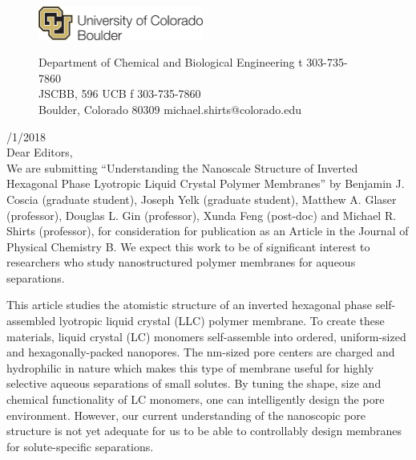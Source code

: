 \documentclass[fontsize=11pt]{article}
\begin{document}
	\graphicspath{{./figures/}}

	\begin{figure}
	\centering
	\begin{minipage}{0.37\textwidth}
	\includegraphics[width=2.14in,left]{CUBoulder.pdf}
	\end{minipage}
	\begin{minipage}{0.62\textwidth}
	\scriptsize
	\noindent Department of Chemical and Biological Engineering \hfill t 303-735-7860~~~~~~~~~~~~~~~~~~ \\
	\noindent JSCBB, 596 UCB \hfill f 303-735-7860~~~~~~~~~~~~~~~~~~ \\
	\noindent Boulder, Colorado 80309 \hfill michael.shirts@colorado.edu \\
	\end{minipage}
	\end{figure}
	
	/1/2018\\
	
	\noindent Dear Editors,\\
	
	We are submitting ``Understanding the Nanoscale Structure of Inverted Hexagonal 
	Phase Lyotropic Liquid Crystal Polymer Membranes'' by Benjamin J. Coscia (graduate
	student), Joseph Yelk (graduate student), Matthew A. Glaser (professor), Douglas
	L. Gin (professor), Xunda Feng (post-doc) and Michael R. Shirts (professor), for
	consideration for publication as an Article in the Journal of Physical Chemistry
	B. We expect this work to be of significant interest to researchers who study 
	nanostructured polymer membranes for aqueous separations.
	
	This article studies the atomistic structure of an inverted hexagonal phase 
	self-assembled lyotropic liquid crystal (LLC) polymer membrane. To create these
	materials, liquid crystal (LC) monomers self-assemble into ordered, uniform-sized
	and hexagonally-packed nanopores. The nm-sized pore centers are charged and hydrophilic 
	in nature which makes this type of membrane useful for highly selective aqueous 
	separations of small solutes. By tuning the shape, size and chemical functionality
	of LC monomers, one can intelligently design the pore environment. However,	our 
	current understanding of the nanoscopic pore structure is not yet adequate for us to
	be able to controllably design membranes for solute-specific separations.
	
\end{document}
